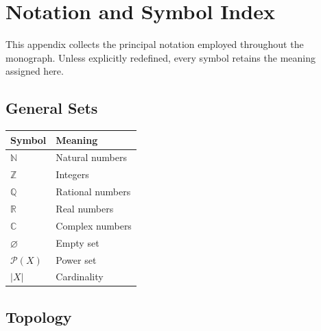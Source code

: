 \documentclass[11pt]{book}
\numberwithin{equation}{chapter}
\theoremstyle{definition}
\theoremstyle{plain}
\begin{document}
\chapter{Notation and Symbol Index}

This appendix collects the principal notation employed throughout the
monograph. Unless explicitly redefined, every symbol retains the meaning
assigned here.


\section{General Sets}

\begin{center}

\begin{tabular}{ll}

Symbol & Meaning
\\
\hline

$\mathbb N$ &
Natural numbers
\\

$\mathbb Z$ &
Integers
\\

$\mathbb Q$ &
Rational numbers
\\

$\mathbb R$ &
Real numbers
\\

$\mathbb C$ &
Complex numbers
\\

$\varnothing$ &
Empty set
\\

$\mathcal P(X)$ &
Power set
\\

$|X|$ &
Cardinality

\end{tabular}

\end{center}


\section{Topology}
\end{document}
